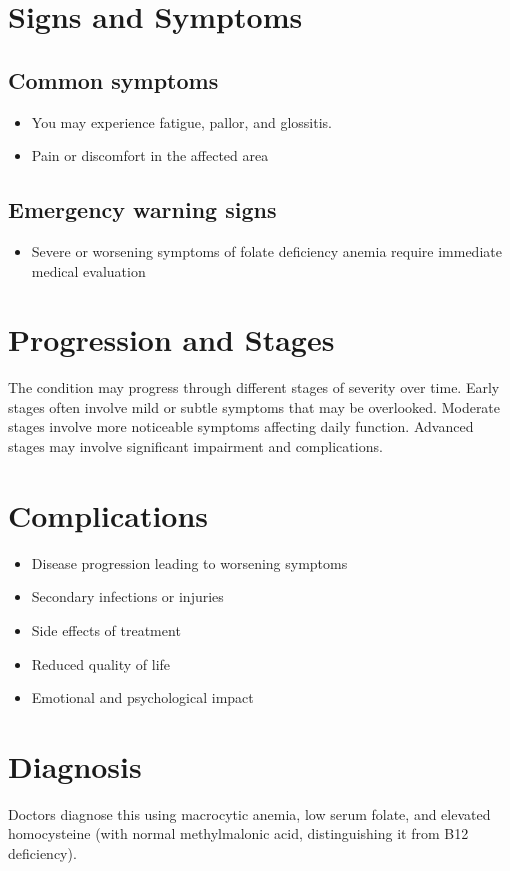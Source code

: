 \section{Signs and Symptoms}

\subsection{Common symptoms}
\begin{itemize}[noitemsep]
  \item You may experience fatigue, pallor, and glossitis.
  \item Pain or discomfort in the affected area
  \end{itemize}

\subsection{Emergency warning signs}
\begin{itemize}[noitemsep]
  \item Severe or worsening symptoms of folate deficiency anemia require immediate medical evaluation
\end{itemize}
\section{Progression and Stages}
The condition may progress through different stages of severity over time. Early stages often involve mild or subtle symptoms that may be overlooked. Moderate stages involve more noticeable symptoms affecting daily function. Advanced stages may involve significant impairment and complications.
\section{Complications}
\begin{itemize}[noitemsep]
  \item Disease progression leading to worsening symptoms
  \item Secondary infections or injuries
  \item Side effects of treatment
  \item Reduced quality of life
  \item Emotional and psychological impact
\end{itemize}
\section{Diagnosis}
Doctors diagnose this using macrocytic anemia, low serum folate, and elevated homocysteine (with normal methylmalonic acid, distinguishing it from B12 deficiency).


